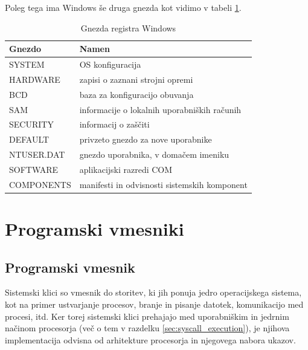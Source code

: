 \documentclass[a4paper,12pt,openright]{book}
\begin{document}
Poleg tega ima Windows še druga gnezda kot vidimo v tabeli \ref{tab:windows_registry_hives}.

\begin{table}[h!]
	\begin{center}
		\begin{tabular}{ p{3.7cm}|p{8.8cm} }
			Gnezdo     & Namen                                         \\
			\hline
			SYSTEM     & OS konfiguracija                              \\
			HARDWARE   & zapisi o zaznani strojni opremi               \\
			BCD        & baza za konfiguracijo obuvanja                \\
			SAM        & informacije o lokalnih uporabniških računih \\
			SECURITY   & informacij o zaščiti                        \\
			DEFAULT    & privzeto gnezdo za nove uporabnike            \\
			NTUSER.DAT & gnezdo uporabnika, v domačem imeniku         \\
			SOFTWARE   & aplikacijski razredi COM                      \\
			COMPONENTS & manifesti in odvisnosti sistemskih komponent  \\
		\end{tabular}
	\end{center}
	\caption{Gnezda registra Windows \cite{Tanenbaum_Bos_2023}}
	\label{tab:windows_registry_hives}
\end{table}


\chapter{Programski vmesniki}

\section{Programski vmesnik} \label{sec:syscalls}

Sistemski klici so vmesnik do storitev, ki jih ponuja jedro operacijskega sistema, kot na primer ustvarjanje procesov, branje in pisanje datotek, komunikacijo med procesi, itd.
Ker torej sistemski klici prehajajo med uporabniškim in jedrnim načinom procesorja (več o tem v razdelku \ref{sec:syscall_execution}), je njihova implementacija odvisna od arhitekture procesorja in njegovega nabora ukazov.
\end{document}
